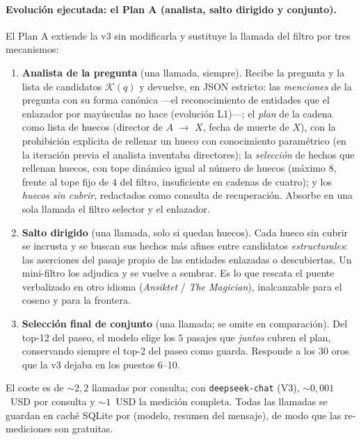 \documentclass[11pt,a4paper]{article}
\begin{document}
\paragraph{Evolución ejecutada: el Plan A (analista, salto dirigido y conjunto).}
El Plan A extiende la v3 sin modificarla y sustituye la llamada del
filtro por tres mecanismos:
\begin{enumerate}[leftmargin=1.6em, itemsep=2pt]
\item \textbf{Analista de la pregunta} (una llamada, siempre). Recibe la
  pregunta y la lista de candidatos $\mathcal{K}(q)$ y devuelve, en JSON
  estricto: las \emph{menciones} de la pregunta con su forma canónica
  ---el reconocimiento de entidades que el enlazador por mayúsculas no
  hace (evolución L1)---; el \emph{plan} de la cadena como lista de
  huecos (\guillemotleft{}director de $A$ $\to$ $X$\guillemotright{}, \guillemotleft{}fecha de muerte de
  $X$\guillemotright{}), con la prohibición explícita de rellenar un hueco con
  conocimiento paramétrico (en la iteración previa el analista inventaba
  directores); la \emph{selección} de hechos que rellenan huecos, con
  tope dinámico igual al número de huecos (máximo $8$, frente al tope
  fijo de $4$ del filtro, insuficiente en cadenas de cuatro); y los
  \emph{huecos sin cubrir}, redactados como consulta de recuperación.
  Absorbe en una sola llamada el filtro selector y el enlazador.
\item \textbf{Salto dirigido} (una llamada, solo si quedan huecos). Cada
  hueco sin cubrir se incrusta y se buscan sus hechos más afines entre
  candidatos \emph{estructurales}: las aserciones del pasaje propio de
  las entidades enlazadas o descubiertas. Un mini-filtro los adjudica y
  se vuelve a sembrar. Es lo que rescata el puente verbalizado en otro
  idioma (\emph{Ansiktet} / \emph{The Magician}), inalcanzable para el
  coseno y para la frontera.
\item \textbf{Selección final de conjunto} (una llamada; se omite en
  comparación). Del top-12 del paseo, el modelo elige los $5$ pasajes que
  \emph{juntos} cubren el plan, conservando siempre el top-2 del paseo
  como guarda. Responde a los $30$ oros que la v3 dejaba en los puestos
  6--10.
\end{enumerate}
El coste es de $\sim 2{,}2$ llamadas por consulta; con
\texttt{deepseek-chat} (V3), $\sim 0{,}001$~USD por consulta y $\sim
1$~USD la medición completa. Todas las llamadas se guardan en caché
SQLite por (modelo, resumen del mensaje), de modo que las re-mediciones
son gratuitas.
\end{document}
